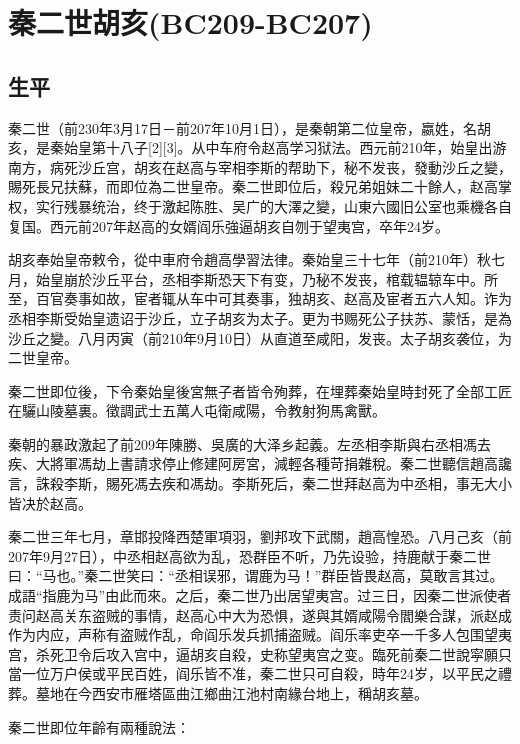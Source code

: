 
\section{秦二世胡亥\tiny(BC209-BC207)}

\subsection{生平}


秦二世（前230年3月17日－前207年10月1日），是秦朝第二位皇帝，嬴姓，名胡亥，是秦始皇第十八子[2][3]。从中车府令赵高学习狱法。西元前210年，始皇出游南方，病死沙丘宫，胡亥在赵高与宰相李斯的帮助下，秘不发丧，發動沙丘之變，賜死長兄扶蘇，而即位為二世皇帝。秦二世即位后，殺兄弟姐妹二十餘人，赵高掌权，实行残暴统治，终于激起陈胜、吴广的大澤之變，山東六國旧公室也乘機各自复国。西元前207年赵高的女婿阎乐強逼胡亥自刎于望夷宫，卒年24岁。

胡亥奉始皇帝敕令，從中車府令趙高學習法律。秦始皇三十七年（前210年）秋七月，始皇崩於沙丘平台，丞相李斯恐天下有变，乃秘不发丧，棺载辒辌车中。所至，百官奏事如故，宦者辄从车中可其奏事，独胡亥、赵高及宦者五六人知。诈为丞相李斯受始皇遗诏于沙丘，立子胡亥为太子。更为书赐死公子扶苏、蒙恬，是為沙丘之變。八月丙寅（前210年9月10日）从直道至咸阳，发丧。太子胡亥袭位，为二世皇帝。

秦二世即位後，下令秦始皇後宮無子者皆令殉葬，在埋葬秦始皇時封死了全部工匠在驪山陵墓裏。徵調武士五萬人屯衛咸陽，令教射狗馬禽獸。

秦朝的暴政激起了前209年陳勝、吳廣的大泽乡起義。左丞相李斯與右丞相馮去疾、大將軍馮劫上書請求停止修建阿房宮，減輕各種苛捐雜稅。秦二世聽信趙高讒言，誅殺李斯，賜死馮去疾和馮劫。李斯死后，秦二世拜赵高为中丞相，事无大小皆决於赵高。

秦二世三年七月，章邯投降西楚軍項羽，劉邦攻下武關，趙高惶恐。八月己亥（前207年9月27日），中丞相赵高欲为乱，恐群臣不听，乃先设验，持鹿献于秦二世曰：“马也。”秦二世笑曰：“丞相误邪，谓鹿为马！”群臣皆畏赵高，莫敢言其过。成語“指鹿为马”由此而來。之后，秦二世乃出居望夷宫。过三日，因秦二世派使者责问赵高关东盗贼的事情，赵高心中大为恐惧，遂與其婿咸陽令閻樂合謀，派赵成作为内应，声称有盗贼作乱，命阎乐发兵抓捕盗贼。阎乐率吏卒一千多人包围望夷宫，杀死卫令后攻入宫中，逼胡亥自殺，史称望夷宫之变。臨死前秦二世說寜願只當一位万户侯或平民百姓，阎乐皆不准，秦二世只可自殺，時年24岁，以平民之禮葬。墓地在今西安市雁塔區曲江鄉曲江池村南緣台地上，稱胡亥墓。


秦二世即位年齡有兩種說法：

